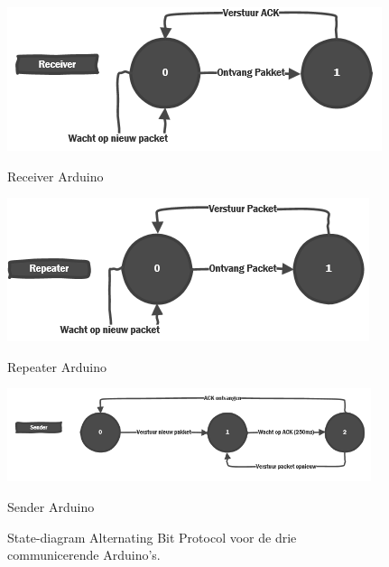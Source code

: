 \documentclass[a4paper,10pt]{article}
\begin{document}
\begin{figure}[ht!]
    \begin{minipage}{\textwidth}
        \begin{minipage}{0.49\textwidth}
            \centering
            \includegraphics[width=\textwidth]{receiver.png}
            \caption*{Receiver Arduino}
        \end{minipage}
        \hfill
        \begin{minipage}{0.49\textwidth}
            \centering
            \includegraphics[width=\textwidth]{repeater.png}
            \caption*{Repeater Arduino}
        \end{minipage}
        \hfill\centering
        \begin{minipage}{0.8\textwidth}
            \centering
            \includegraphics[width=0.95\textwidth]{sender.png}
            \caption*{Sender Arduino}
        \end{minipage}
    \caption{State-diagram Alternating Bit Protocol voor de drie communicerende Arduino's.}
    \label{fig:roles}
    \end{minipage}
\end{figure}
\end{document}
